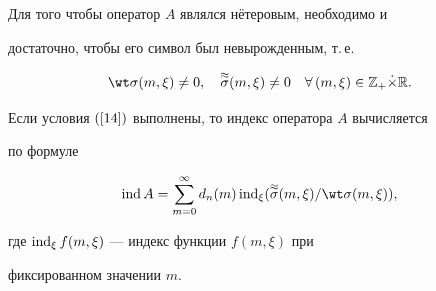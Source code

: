 \begin{thm}


Для того чтобы оператор $A$ являлся н\"етеровым, необходимо и


достаточно, чтобы его символ был невырожденным, т.\,е.


\begin{equation}


\wt\sigma(m,\xi)\ne 0,\quad


\apsigma(m,\xi)\ne 0\quad \forall\,(m,\xi)\in \Bbb Z_+\Dot\times\Bbb R.


\label{14}


\end{equation}


Если условия $(\ref{14})$ выполнены, то индекс оператора $A$ вычисляется


по формуле


\begin{equation}


\ind A=\sum_{m=0}^\infty d_n(m)\ind_\xi


(\apsigma(m,\xi)/\wt\sigma(m,\xi)), \label{15}


\end{equation}


где $\operatorname{ind}_\xi f(m,\xi)$ --- индекс функции $f(m,\xi)$ при


фиксированном значении $m$.


\end{thm}





